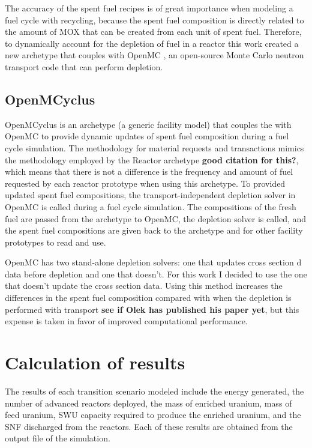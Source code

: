 

The accuracy of the spent fuel recipes is of great importance 
when modeling a fuel cycle with recycling, because the spent fuel 
composition is directly related to the amount of \gls{MOX} that 
can be created from each unit of spent fuel. Therefore, to 
dynamically account for the depletion of fuel in a reactor 
this work created a new \Cyclus archetype that couples \Cyclus with 
OpenMC \cite{romano_openmc:_2015}, an open-source Monte Carlo 
neutron transport code that can perform depletion. 

\subsection{OpenMCyclus}
OpenMCyclus is an archetype (a generic facility model) that couples the 
\Cyclus with OpenMC to provide dynamic updates of spent fuel composition 
during a fuel cycle simulation. The methodology for material requests 
and transactions mimics the methodology employed by the \Cycamore 
Reactor archetype \textbf{good citation for this?}, which means that
there is not a difference is the frequency and amount of fuel requested 
by each reactor prototype when using this archetype. To provided 
updated spent fuel compositions, the transport-independent depletion 
solver in OpenMC \cite{romano_depletion_2021} is called during a fuel cycle 
simulation. The compositions of the fresh fuel are passed from the archetype 
to OpenMC, the depletion solver is called, and the spent fuel compositions 
are given back to the archetype and \Cyclus for other facility prototypes 
to read and use. 

OpenMC has two stand-alone depletion solvers: one that updates cross section d
data before depletion and one that doesn't. For this work I decided to use 
the one that doesn't update the cross section data. Using this method increases 
the differences in the spent fuel composition compared with when the depletion 
is performed with transport \textbf{see if Olek has published his paper yet},
but this expense is taken in favor of improved computational performance. 
 

\section{Calculation of results} \label{sec:results_calc}
The results of each transition scenario modeled include the energy generated, 
the number of advanced reactors deployed, the mass of enriched uranium, 
mass of feed uranium, \gls{SWU} capacity required to produce the enriched 
uranium, and the \gls{SNF} discharged from the reactors. Each of these results 
are obtained from the \Cyclus output file of the simulation. 

